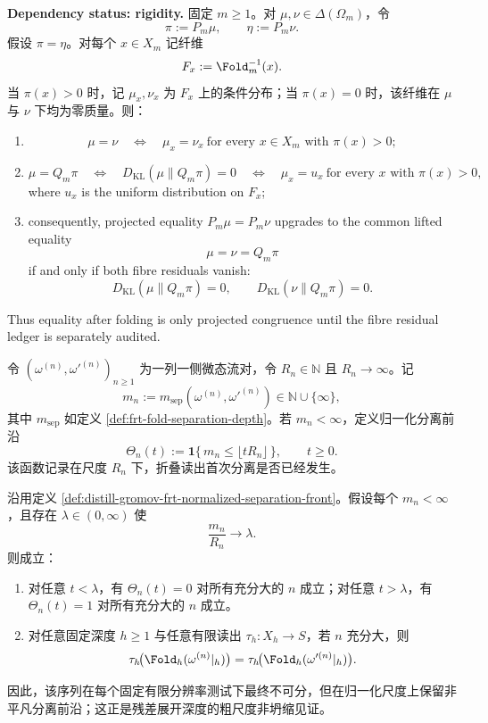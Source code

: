 \begin{proposition}\label{prop:distill-euclid-elements-frt-projected-equality-lift-audit}
\textbf{Dependency status: rigidity.}
固定 \(m\ge1\)。对 \(\mu,\nu\in\Delta(\Omega_m)\)，令
\[
\pi:=P_m\mu,
\qquad
\eta:=P_m\nu.
\]
假设 \(\pi=\eta\)。对每个 \(x\in X_m\) 记纤维
\[
F_x:=\Fold_m^{-1}(x).
\]
当 \(\pi(x)>0\) 时，记 \(\mu_x,\nu_x\) 为 \(F_x\) 上的条件分布；当 \(\pi(x)=0\) 时，该纤维在 \(\mu\) 与 \(\nu\) 下均为零质量。则：
\begin{enumerate}
  \item
  \[
  \mu=\nu
  \quad\Longleftrightarrow\quad
  \mu_x=\nu_x\ \text{for every }x\in X_m\text{ with }\pi(x)>0;
  \]
  \item
  \[
  \mu=Q_m\pi
  \quad\Longleftrightarrow\quad
  D_{\mathrm{KL}}(\mu\|Q_m\pi)=0
  \quad\Longleftrightarrow\quad
  \mu_x=u_x\ \text{for every }x\text{ with }\pi(x)>0,
  \]
  where \(u_x\) is the uniform distribution on \(F_x\);
  \item consequently, projected equality \(P_m\mu=P_m\nu\) upgrades to the common lifted equality
  \[
  \mu=\nu=Q_m\pi
  \]
  if and only if both fibre residuals vanish:
  \[
  D_{\mathrm{KL}}(\mu\|Q_m\pi)=0,
  \qquad
  D_{\mathrm{KL}}(\nu\|Q_m\pi)=0.
  \]
\end{enumerate}
Thus equality after folding is only projected congruence until the fibre residual ledger is separately audited.
\end{proposition}

\begin{definition}[归一化折叠分离前沿]\label{def:distill-gromov-frt-normalized-separation-front}
令 \((\omega^{(n)},\omega'^{(n)})_{n\ge1}\) 为一列一侧微态流对，令 \(R_n\in\mathbb N\) 且 \(R_n\to\infty\)。记
\[
m_n:=m_{\mathrm{sep}}(\omega^{(n)},\omega'^{(n)})\in\mathbb N\cup\{\infty\},
\]
其中 \(m_{\mathrm{sep}}\) 如定义 \ref{def:frt-fold-separation-depth}。若 \(m_n<\infty\)，定义归一化分离前沿
\[
\Theta_n(t):=\mathbf 1\{\,m_n\le \lfloor tR_n\rfloor\,\},\qquad t\ge0.
\]
该函数记录在尺度 \(R_n\) 下，折叠读出首次分离是否已经发生。
\end{definition}

\begin{proposition}[有限测试失明与非坍缩分离前沿]\label{prop:distill-gromov-frt-normalized-separation-front}
沿用定义 \ref{def:distill-gromov-frt-normalized-separation-front}。假设每个 \(m_n<\infty\)，且存在 \(\lambda\in(0,\infty)\) 使
\[
\frac{m_n}{R_n}\longrightarrow \lambda.
\]
则成立：
\begin{enumerate}
  \item 对任意 \(t<\lambda\)，有 \(\Theta_n(t)=0\) 对所有充分大的 \(n\) 成立；对任意 \(t>\lambda\)，有 \(\Theta_n(t)=1\) 对所有充分大的 \(n\) 成立。
  \item 对任意固定深度 \(h\ge1\) 与任意有限读出 \(\tau_h:X_h\to S\)，若 \(n\) 充分大，则
  \[
  \tau_h\!\bigl(\Fold_h(\omega^{(n)}|_h)\bigr)
  =
  \tau_h\!\bigl(\Fold_h(\omega'^{(n)}|_h)\bigr).
  \]
\end{enumerate}
因此，该序列在每个固定有限分辨率测试下最终不可分，但在归一化尺度上保留非平凡分离前沿；这正是残差展开深度的粗尺度非坍缩见证。
\end{proposition}

